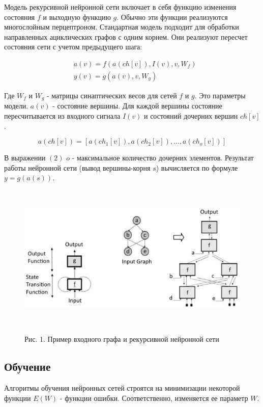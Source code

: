 \documentclass[14pt]{article}
\begin{document}
Модель рекурсивной нейронной сети включает в себя функцию изменения состояния $f$ и выходную функцию $g$. Обычно эти функции реализуются многослойным перцептроном. Стандартная модель подходит для обработки направленных ациклических графов с одним корнем. Они реализуют пересчет состояния сети с учетом предыдущего шага:


\begin{eqnarray}
&a(v) = f(a(ch[v]), I(v), v, W_f)\nonumber\\
&y(v) = g(a(v), v, W_g)
\end{eqnarray}


Где $W_f$ и $W_g$ - матрицы синаптических весов для сетей $f$ и $g$. Это параметры модели. $a(v)$ - состояние вершины. Для каждой вершины состояние пересчитывается из входного сигнала $I(v)$ и состояний дочерних вершин $ch[v]$.


\begin{equation}
\label{trivial}
a(ch[v]) = [a(ch_1[v]), a(ch_2[v]), \dots, a(ch_o[v])]
\end{equation}


В выражении $(2)$ $o$ - максимальное количество дочерних элементов. Результат работы нейронной сети (вывод вершины-корня $s$) вычисляется по формуле $y = g(a(s))$.


\begin{figure}[!h]
    \centering
        \includegraphics[height=7cm]{Fig1.png}
    \parbox[t][1.2cm][c]{16cm}{
        \centering
        Рис. 1. Пример входного графа и рекурсивной  нейронной сети
    }
\end{figure}


\subsection{Обучение}
Алгоритмы обучения нейронных сетей строятся на минимизации некоторой функции $E(W)$ - функции ошибки. Соответственно, изменяется ее параметр $W$.
\end{document}

